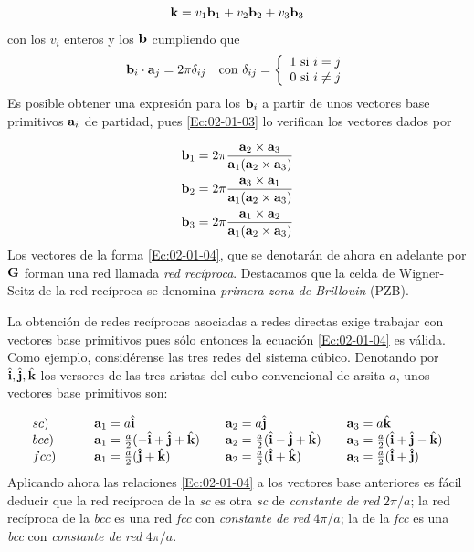 \begin{equation}
    \mathbf{k} = v_1 \mathbf{b}_1 + v_2 \mathbf{b}_2 + v_3 \mathbf{b}_3 \label{Ec:02-01-02}
\end{equation}
con los $v_i$ enteros y los $\mathbf{b}$ cumpliendo que
\begin{equation}
    \mathbf{b}_i \cdot \mathbf{a}_j = 2 \pi \delta_{ij}  \quad \text{con} \ \delta_{ij} = \left\lbrace \begin{array}{l}
        1 \ \text{si} \ i = j \\
        0 \ \text{si} \ i \neq j
    \end{array} \right. \label{Ec:02-01-03}
\end{equation}
Es posible obtener una expresión para los $\mathbf{b}_i$ a partir de unos vectores base primitivos $\mathbf{a}_i$ de partidad, pues \ref{Ec:02-01-03} lo verifican los vectores dados por

\begin{equation}
    \begin{split}    
    \mathbf{b}_1 & = 2 \pi \frac{\mathbf{a}_2 \times \mathbf{a}_3}{\mathbf{a}_1 (\mathbf{a}_2 \times \mathbf{a}_3)} \\
    \mathbf{b}_2 & = 2 \pi \frac{\mathbf{a}_3 \times \mathbf{a}_1}{\mathbf{a}_1 (\mathbf{a}_2 \times \mathbf{a}_3)}  \\
    \mathbf{b}_3 & = 2 \pi \frac{\mathbf{a}_1 \times \mathbf{a}_2}{\mathbf{a}_1 (\mathbf{a}_2 \times \mathbf{a}_3)}
    \end{split}\label{Ec:02-01-04}
\end{equation}
Los vectores de la forma \ref{Ec:02-01-04}, que se denotarán de ahora en adelante por $\mathbf{G}$ forman una red llamada \textit{red recíproca}. Destacamos que la celda de Wigner-Seitz de la red recíproca se denomina \textit{primera zona de Brillouin} (PZB). 

La obtención de redes recíprocas asociadas a redes directas exige trabajar con vectores base primitivos pues sólo entonces la ecuación \ref{Ec:02-01-04} es válida. Como ejemplo, considérense las tres redes del sistema cúbico. Denotando por $\hat{\mathbf{i}}, \hat{\mathbf{j}}, \hat{\mathbf{k}}$ los versores de las tres aristas del cubo convencional de arsita $a$, unos vectores base primitivos son:

\begin{equation*}
    \begin{array}{llll}
    sc) \quad &  \quad \mathbf{a}_1 = a \hat{\mathbf{i}} & \quad \mathbf{a}_2 = a \hat{\mathbf{j}} & \quad \mathbf{a}_3 = a \hat{\mathbf{k}} \\
    bcc)  \quad & \quad \mathbf{a}_1 = \frac{a}{2} (-\hat{\mathbf{i}}+\hat{\mathbf{j}}+\hat{\mathbf{k}}) & \quad \mathbf{a}_2 = \frac{a}{2} (\hat{\mathbf{i}}-\hat{\mathbf{j}}+\hat{\mathbf{k}})  & \quad \mathbf{a}_3 = \frac{a}{2} (\hat{\mathbf{i}}+\hat{\mathbf{j}}-\hat{\mathbf{k}})  \\
    fcc) \quad & \quad \mathbf{a}_1 = \frac{a}{2} (\hat{\mathbf{j}} + \hat{\mathbf{k}}) & \quad \mathbf{a}_2 = \frac{a}{2} (\hat{\mathbf{i}} + \hat{\mathbf{k}}) & \quad \mathbf{a}_3 = \frac{a}{2} (\hat{\mathbf{i}} + \hat{\mathbf{j}}) \\
    \end{array}
\end{equation*}
Aplicando ahora las relaciones \ref{Ec:02-01-04} a los vectores base anteriores es fácil deducir que la red recíproca de la \textit{sc} es otra \textit{sc} de \textit{constante de red} $2\pi/a$; la red recíproca de la \textit{bcc} es una red \textit{fcc} con \textit{constante de red} $4\pi/a$; la de la \textit{fcc} es una \textit{bcc} con \textit{constante de red} $4 \pi/a$. 

